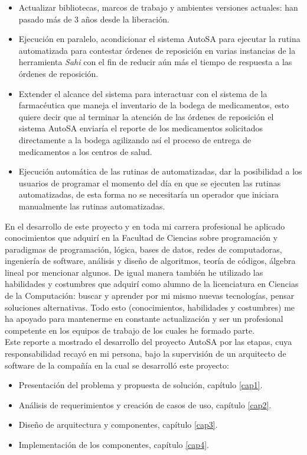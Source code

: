 \begin{itemize}
	\item Actualizar bibliotecas, marcos de trabajo y ambientes versiones actuales: han pasado más de 3 años desde la liberación.
	\item Ejecución en paralelo, acondicionar el sistema AutoSA para ejecutar la rutina automatizada para contestar órdenes de reposición en varias instancias de la herramienta \textit{Sahi} con el fin de reducir aún más el tiempo de respuesta a las órdenes de reposición.
	\item Extender el alcance del sistema para interactuar con el sistema de la farmacéutica que maneja el inventario de la bodega de medicamentos, esto quiere decir que al terminar la atención de las órdenes de reposición el sistema AutoSA enviaría el reporte de los medicamentos solicitados directamente a la bodega agilizando así el proceso de entrega de medicamentos a los centros de salud. 
	\item Ejecución automática de las rutinas de automatizadas, dar la posibilidad a los usuarios de programar el momento del día en que se ejecuten las rutinas automatizadas, de esta forma no se necesitaría un operador que iniciara manualmente las rutinas automatizadas.
\end{itemize}
En el desarrollo de este proyecto y en toda mi carrera profesional he aplicado conocimientos que adquirí en la Facultad de Ciencias sobre programación y paradigmas de programación, lógica, bases de datos, redes de computadoras, ingeniería de software, análisis y diseño de algoritmos, teoría de códigos, álgebra lineal por mencionar algunos. De igual manera también he utilizado las habilidades y costumbres que adquirí como alumno de la licenciatura en Ciencias de la Computación: buscar y aprender por mi mismo nuevas tecnologías, pensar soluciones alternativas. Todo esto (conocimientos, habilidades y costumbres) me ha apoyado para mantenerme en constante actualización y ser un profesional competente en los equipos de trabajo de los cuales he formado parte.\\
Este reporte a mostrado el desarrollo del proyecto AutoSA por las etapas, cuya responsabilidad recayó en mi persona, bajo la supervisión de un arquitecto de software de la compañía en la cual se desarrolló este proyecto:
\begin{itemize}
 	\item Presentación del problema y propuesta de solución, capítulo \ref{cap1}. 
 	\item Análisis de requerimientos y creación de casos de uso, capítulo \ref{cap2}.
 	\item Diseño de arquitectura y componentes, capítulo \ref{cap3}.
 	\item Implementación de los componentes, capítulo \ref{cap4}.
\end{itemize} 
